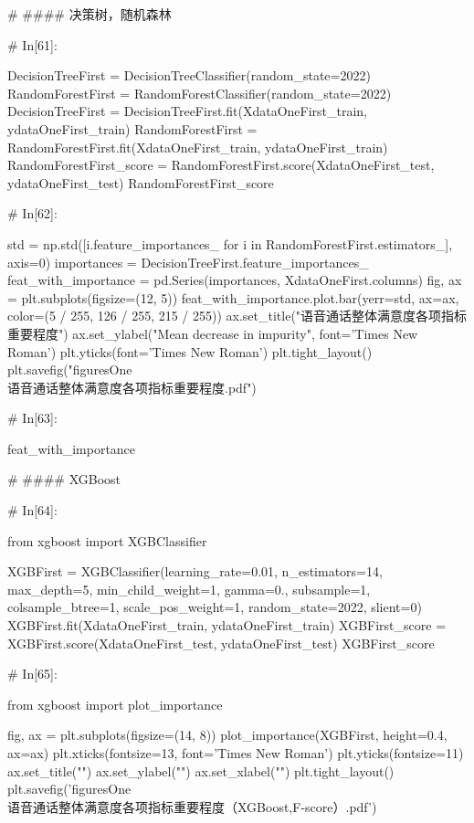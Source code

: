 \documentclass{MathorCupmodeling}
\begin{document}
\begin{python}
	# #### 决策树，随机森林
	
	# In[61]:
	
	
	DecisionTreeFirst = DecisionTreeClassifier(random_state=2022)
	RandomForestFirst = RandomForestClassifier(random_state=2022)
	DecisionTreeFirst = DecisionTreeFirst.fit(XdataOneFirst_train, ydataOneFirst_train)
	RandomForestFirst = RandomForestFirst.fit(XdataOneFirst_train, ydataOneFirst_train)
	RandomForestFirst_score = RandomForestFirst.score(XdataOneFirst_test, ydataOneFirst_test)
	RandomForestFirst_score
	
	# In[62]:
	
	
	std = np.std([i.feature_importances_ for i in RandomForestFirst.estimators_], axis=0)
	importances = DecisionTreeFirst.feature_importances_
	feat_with_importance = pd.Series(importances, XdataOneFirst.columns)
	fig, ax = plt.subplots(figsize=(12, 5))
	feat_with_importance.plot.bar(yerr=std, ax=ax, color=(5 / 255, 126 / 255, 215 / 255))
	ax.set_title("语音通话整体满意度各项指标重要程度")
	ax.set_ylabel("Mean decrease in impurity", font='Times New Roman')
	plt.yticks(font='Times New Roman')
	plt.tight_layout()
	plt.savefig("figuresOne\\[附件1]语音通话整体满意度各项指标重要程度.pdf")
	
	# In[63]:
	
	
	feat_with_importance
	
	# #### XGBoost
	
	# In[64]:
	
	
	from xgboost import XGBClassifier
	
	XGBFirst = XGBClassifier(learning_rate=0.01,
							 n_estimators=14,
							 max_depth=5,
							 min_child_weight=1,
							 gamma=0.,
							 subsample=1,
							 colsample_btree=1,
							 scale_pos_weight=1,
							 random_state=2022,
							 slient=0)
	XGBFirst.fit(XdataOneFirst_train, ydataOneFirst_train)
	XGBFirst_score = XGBFirst.score(XdataOneFirst_test, ydataOneFirst_test)
	XGBFirst_score
	
	# In[65]:
	
	
	from xgboost import plot_importance
	
	fig, ax = plt.subplots(figsize=(14, 8))
	plot_importance(XGBFirst, height=0.4, ax=ax)
	plt.xticks(fontsize=13, font='Times New Roman')
	plt.yticks(fontsize=11)
	ax.set_title("")
	ax.set_ylabel("")
	ax.set_xlabel("")
	plt.tight_layout()
	plt.savefig('figuresOne\\[附件1]语音通话整体满意度各项指标重要程度（XGBoost,F-score）.pdf')
	

\end{python}
\end{document}
